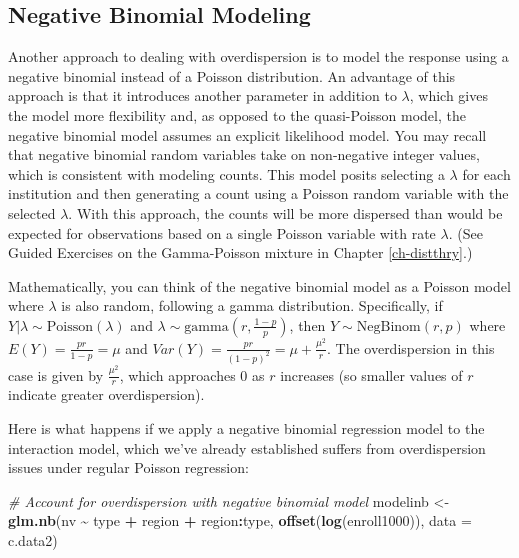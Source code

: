 \documentclass[
]{krantz}
\newenvironment{Shaded}{\begin{snugshade}}{\end{snugshade}}
\newcommand{\AttributeTok}[1]{\textcolor[rgb]{0.27,0.27,0.27}{#1}}
\newcommand{\CommentTok}[1]{\textcolor[rgb]{0.37,0.37,0.37}{\textit{#1}}}
\newcommand{\FunctionTok}[1]{\textcolor[rgb]{0.27,0.27,0.27}{\textbf{#1}}}
\newcommand{\NormalTok}[1]{#1}
\newcommand{\OtherTok}[1]{\textcolor[rgb]{0.37,0.37,0.37}{#1}}
\newcommand{\SpecialCharTok}[1]{\textcolor[rgb]{0.43,0.43,0.43}{\textbf{#1}}}
\begin{document}
\subsection{Negative Binomial Modeling}\label{negative-binomial-modeling}

Another approach to dealing with overdispersion is to model the response using a negative binomial instead of a Poisson distribution. An advantage of this approach is that it introduces another parameter in addition to \(\lambda\), which gives the model more flexibility and, as opposed to the quasi-Poisson model, the negative binomial model assumes an explicit likelihood model. You may recall that negative binomial random variables take on non-negative integer values, which is consistent with modeling counts. This model posits selecting a \(\lambda\) for each institution and then generating a count using a Poisson random variable with the selected \(\lambda\). With this approach, the counts will be more dispersed than would be expected for observations based on a single Poisson variable with rate \(\lambda\). (See Guided Exercises on the Gamma-Poisson mixture in Chapter \ref{ch-distthry}.)

Mathematically, you can think of the negative binomial model as a Poisson model where \(\lambda\) is also random, following a gamma distribution. Specifically, if \(Y|\lambda \sim \textrm{Poisson}(\lambda)\) and \(\lambda \sim \textrm{gamma}(r,\frac{1-p}{p})\), then \(Y \sim \textrm{NegBinom}(r,p)\) where \(E(Y)=\frac{pr}{1-p}=\mu\) and \(Var(Y)=\frac{pr}{(1-p)^2}=\mu+\frac{\mu^2}{r}\). The overdispersion in this case is given by \(\frac{\mu^2}{r}\), which approaches 0 as \(r\) increases (so smaller values of \(r\) indicate greater overdispersion).

Here is what happens if we apply a negative binomial regression model  to the interaction model, which we've already established suffers from overdispersion issues under regular Poisson regression:

\begin{Shaded}
\begin{Highlighting}[]
\CommentTok{\# Account for overdispersion with negative binomial model}
\NormalTok{modelinb }\OtherTok{\textless{}{-}} \FunctionTok{glm.nb}\NormalTok{(nv }\SpecialCharTok{\textasciitilde{}}\NormalTok{ type }\SpecialCharTok{+}\NormalTok{ region }\SpecialCharTok{+}\NormalTok{ region}\SpecialCharTok{:}\NormalTok{type, }
               \FunctionTok{offset}\NormalTok{(}\FunctionTok{log}\NormalTok{(enroll1000)), }\AttributeTok{data =}\NormalTok{ c.data2)}
\end{Highlighting}
\end{Shaded}
\end{document}
